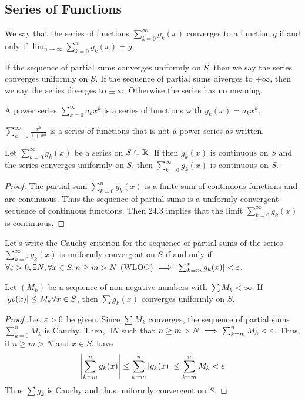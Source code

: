 \documentclass{article}
\begin{document}
\subsection{Series of Functions}
\begin{definition}
  We say that the series of functions $\sum_{k = 0}^\infty g_k(x)$ converges to a function $g$ if and only if $\lim_{n\to\infty} \sum_{k=0}^n g_k(x) = g$.

  If the sequence of partial sums converges uniformly on $S$, then we say the series converges uniformly on $S$. If the sequence of partial sums diverges to $\pm \infty$, then we say the series diverges to $\pm \infty$. Otherwise the series has no meaning.
\end{definition}
\begin{remark}
  A power series $\sum_{k=0}^\infty a_kx^k$ is a series of functions with $g_k(x) = a_kx^k$.

  $\sum_{k=0}^\infty \frac{x^k}{1+x^k}$ is a series of functions that is not a power series as written.
\end{remark}
\begin{cthm}[Theorem 25.5]
  Let $\sum_{k=0}^\infty g_k(x)$ be a series on $S \subseteq \mathbb{R}$. If then $g_k(x)$ is continuous on $S$ and the series converges uniformly on $S$, then $\sum_{k=0}^\infty g_k(x)$ is continuous on $S$.
\end{cthm}
\begin{proof}
  The partial sum $\sum_{k=0}^n g_k(x)$ is a finite sum of continuous functions and are continuous. Thus the sequence of partial sums is a uniformly convergent sequence of continuous functions. Then 24.3 implies that the limit $\sum_{k=0}^\infty g_k(x)$ is continuous.
\end{proof}
\begin{corollary}
  Let's write the Cauchy criterion for the sequence of partial sums of the series $\sum_{k=0}^\infty g_k(x)$ is uniformly convergent on $S$ if and only if $\forall \varepsilon > 0, \exists N, \forall x \in S, n \geq m > N$ (WLOG) $\implies \abs{\sum_{k=m}^n g_k(x)} < \varepsilon$.
\end{corollary}
\begin{cthm}
  Let $(M_k)$ be a sequence of non-negative numbers with $\sum M_k < \infty$. If $\abs{g_k(x)} \leq M_k \forall x \in S$, then $\sum g_k(x)$ converges uniformly on $S$.
\end{cthm}
\begin{proof}
  Let $\varepsilon > 0$ be given. Since $\sum M_k$ converges, the sequence of partial sums $\sum_{k=0}^n M_k$ is Cauchy. Then, $\exists N$ such that $n \geq m > N \implies \sum_{k=m}^n M_k < \varepsilon$. Thus, if $n \geq m > N$ and $x \in S$, have \[
    \abs{\sum_{k=m}^n g_k(x)} \leq \sum_{k=m}^n\abs{g_k(x)} \leq \sum_{k=m}^n M_k < \varepsilon
  \]
  Thus $\sum g_k$ is Cauchy and thus uniformly convergent on $S$.
\end{proof}
\end{document}
